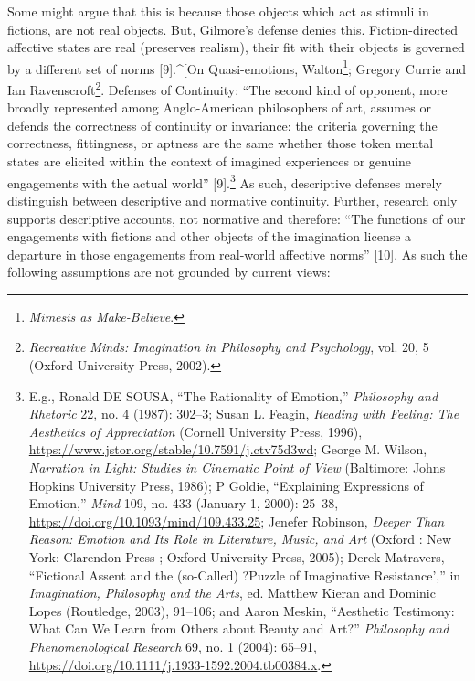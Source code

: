 \documentclass[phdthesis,12pt,final]{wuthesis}
\theoremstyle{definition}
\theoremstyle{definition}
\theoremstyle{definition}
\theoremstyle{definition}
\theoremstyle{remark}
\begin{document}
Some might argue that this is because those objects which act as stimuli in fictions, are not real objects. But, Gilmore's defense denies this. Fiction-directed affective states are real (preserves realism), their fit with their objects is governed by a different set of norms {[}9{]}.\^{}{[}On Quasi-emotions, Walton\footnote{\emph{Mimesis as {Make-Believe}}.}; Gregory Currie and Ian Ravenscroft\footnote{\emph{Recreative Minds: Imagination in Philosophy and Psychology}, vol. 20, 5 (Oxford University Press, 2002).}. Defenses of Continuity: ``The second kind of opponent, more broadly represented among Anglo-American philosophers of art, assumes or defends the correctness of continuity or invariance: the criteria governing the correctness, fittingness, or aptness are the same whether those token mental states are elicited within the context of imagined experiences or genuine engagements with the actual world'' {[}9{]}.\footnote{E.g., Ronald DE SOUSA, {``The {Rationality} of {Emotion},''} \emph{Philosophy and Rhetoric} 22, no. 4 (1987): 302--3; Susan L. Feagin, \emph{Reading with {Feeling}: {The Aesthetics} of {Appreciation}} (Cornell University Press, 1996), \url{https://www.jstor.org/stable/10.7591/j.ctv75d3wd}; George M. Wilson, \emph{Narration in Light: Studies in Cinematic Point of View} (Baltimore: Johns Hopkins University Press, 1986); P Goldie, {``Explaining Expressions of Emotion,''} \emph{Mind} 109, no. 433 (January 1, 2000): 25--38, \url{https://doi.org/10.1093/mind/109.433.25}; Jenefer Robinson, \emph{Deeper Than Reason: Emotion and Its Role in Literature, Music, and Art} (Oxford : New York: Clarendon Press ; Oxford University Press, 2005); Derek Matravers, {``Fictional {Assent} and the (so-{Called}) ?{Puzzle} of {Imaginative Resistance}',''} in \emph{Imagination, {Philosophy} and the {Arts}}, ed. Matthew Kieran and Dominic Lopes (Routledge, 2003), 91--106; and Aaron Meskin, {``Aesthetic {Testimony}: {What Can We Learn} from {Others} about {Beauty} and {Art}?''} \emph{Philosophy and Phenomenological Research} 69, no. 1 (2004): 65--91, \url{https://doi.org/10.1111/j.1933-1592.2004.tb00384.x}.} As such, descriptive defenses merely distinguish between descriptive and normative continuity. Further, research only supports descriptive accounts, not normative and therefore: ``The functions of our engagements with fictions and other objects of the imagination license a departure in those engagements from real-world affective norms'' {[}10{]}. As such the following assumptions are not grounded by current views:
\end{document}
